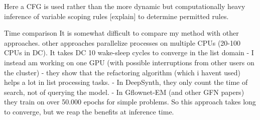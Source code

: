 Here a CFG is used rather than the more dynamic but computationally heavy inference of variable scoping rules [explain] to determine permitted rules.


Time comparison
It is somewhat difficult to compare my method with other approaches.
other approaches parallelize processes on multiple CPUs (20-100 CPUs in DC). It takes DC 10 wake-sleep cycles to converge in the list domain
- I instead am working on one GPU (with possible interruptions from other users on the cluster)
- they show that the refactoring algorithm (which i havent used) helps a lot in list processing tasks.
- In DeepSynth, they only count the time of search, not of querying the model. 
- In Gflownet-EM (and other GFN papers) they train on over 50.000 epochs for simple problems. So this approach takes long to converge, but we reap the benefits at inference time. 


